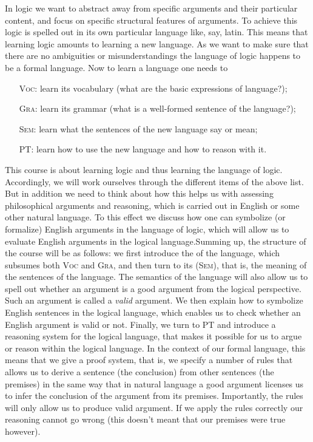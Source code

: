 In logic we want to abstract away from specific arguments and their particular content, and focus on specific structural features of arguments. To achieve this  logic is spelled out in its own particular language like, say, latin.  This means that learning logic amounts to learning a new language. As we want to make sure that there are no ambiguities or misunderstandings the language of logic happens to be a formal language. Now to learn a language one needs to
\begin{itemize}
\item[\textsc{Voc}:]\label{vocInt} learn its vocabulary (what are the basic expressions of language?);
\item[\textsc{Gra}:]\label{graInt} learn its grammar (what is a well-formed sentence of the language?);
\item[\textsc{Sem}:]\label{semInt} learn what the sentences of the new language say or mean;
\item[\textsc{PT}:]\label{ptInt} learn how to use the new language and how to reason with it.
\end{itemize}

This course is about learning logic and thus learning the language of logic. Accordingly, we will work ourselves through the different items of the above list. But in addition we need to think about how this helps us with assessing philosophical arguments and reasoning, which is carried out in English or some other natural language. To this effect we discuss how one can symbolize (or formalize) English arguments in the language of logic, which will allow us to evaluate English arguments in the logical language.Summing up, the structure of the course will be as follows: we first introduce the  of the language, which subsumes both \textsc{Voc} and \textsc{Gra}, and then turn to its  (\textsc{Sem}), that is, the meaning of the sentences of the language. The semantics of the language will also allow us to spell out whether an argument is a good argument from the logical perspective. Such an argument is called a \emph{valid} argument.  We then explain how to symbolize English sentences in the logical language, which enables us to check whether an English argument is valid or not. Finally, we turn to PT and introduce a reasoning system for the logical language, that makes it possible for us to argue or reason within the logical language. In the context of our formal language, this means that we give a proof system, that is, we specify a number of rules that allows us to derive a sentence (the conclusion) from other sentences (the premises) in the same way that in natural language a good argument licenses us to infer the conclusion of the argument from its premises. Importantly, the rules will only allow us to produce valid argument. If we apply the rules correctly our reasoning cannot go wrong (this doesn't meant that our premises were true however).

